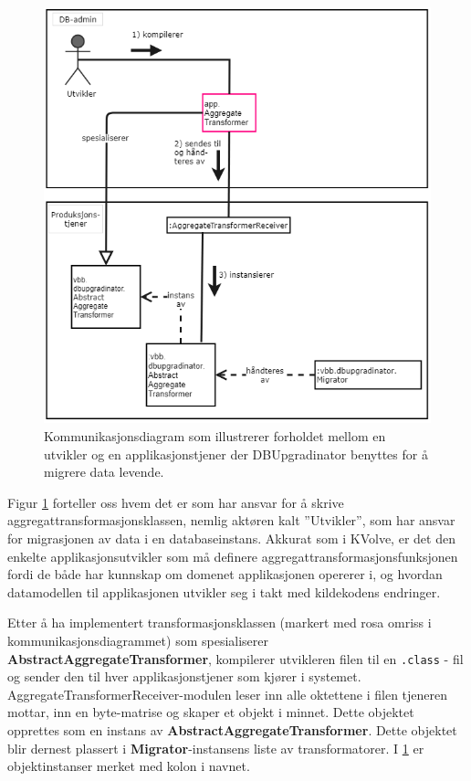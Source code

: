 \begin{figure}[hbtp]
  \centering
  \includegraphics[scale=0.5]{fig/dbupgradinator-logisk-2.png}
  \caption{Kommunikasjonsdiagram som illustrerer forholdet mellom en utvikler og en applikasjonstjener der DBUpgradinator benyttes for å migrere data levende.}
  \label{fig6}
\end{figure}

Figur \ref{fig6} forteller oss hvem det er som har ansvar for å skrive aggregat\-transformasjonsklassen, nemlig aktøren kalt ''Utvikler'', som har ansvar for migrasjonen av data i en databaseinstans. Akkurat som i KVolve, er det den enkelte applikasjonsutvikler som må definere aggregat\-transformasjons\-funksjonen fordi de både har kunnskap om domenet applikasjonen opererer i, og hvordan datamodellen til applikasjonen utvikler seg i takt med kildekodens endringer.

Etter å ha implementert transformasjonsklassen (markert med rosa omriss i kommunikasjonsdiagrammet) som spesialiserer \textbf{AbstractAggregateTransformer}, kompilerer utvikleren filen til en \texttt{.class} - fil og sender den til hver applikasjonstjener som kjører i systemet. AggregateTransformerReceiver-modulen leser inn alle oktettene i filen tjeneren mottar, inn en byte-matrise og skaper et objekt i minnet. Dette objektet opprettes som en instans av \textbf{AbstractAggregateTransformer}. Dette objektet blir dernest plassert i \textbf{Migrator}-instansens liste av transformatorer. I \ref{fig6} er objektinstanser merket med kolon i navnet.

